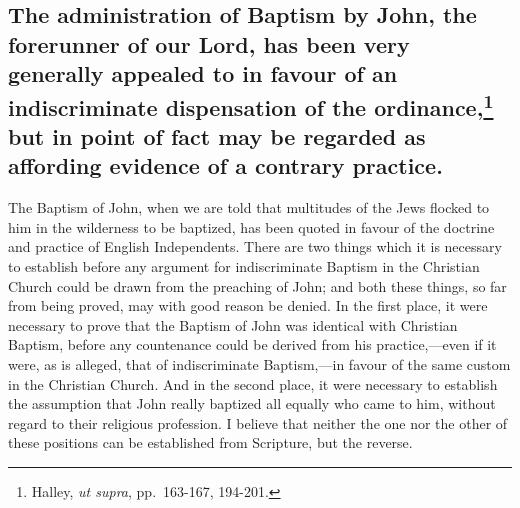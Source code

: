 \documentclass[]{book}
\begin{document}
\hypertarget{the-administration-of-baptism-by-john-the-forerunner-of-our-lord-has-been-very-generally-appealed-to-in-favour-of-an-indiscriminate-dispensation-of-the-ordinance21-but-in-point-of-fact-may-be-regarded-as-affording-evidence-of-a-contrary-practice.}{%
\subsection[The administration of Baptism by John, the forerunner of our Lord, has been very generally appealed to in favour of an indiscriminate dispensation of the ordinance, but in point of fact may be regarded as affording evidence of a contrary practice.]{\texorpdfstring{The administration of Baptism by John, the forerunner of our Lord, has been very generally appealed to in favour of an indiscriminate dispensation of the ordinance,\footnote{Halley, \emph{ut supra}, pp.~163-167, 194-201.} but in point of fact may be regarded as affording evidence of a contrary practice.}{The administration of Baptism by John, the forerunner of our Lord, has been very generally appealed to in favour of an indiscriminate dispensation of the ordinance, but in point of fact may be regarded as affording evidence of a contrary practice.}}\label{the-administration-of-baptism-by-john-the-forerunner-of-our-lord-has-been-very-generally-appealed-to-in-favour-of-an-indiscriminate-dispensation-of-the-ordinance21-but-in-point-of-fact-may-be-regarded-as-affording-evidence-of-a-contrary-practice.}}

The Baptism of John, when we are told that multitudes of the Jews flocked to him in the wilderness to be baptized, has been quoted in favour of the doctrine and practice of English Independents. There are two things which it is necessary to establish before any argument for indiscriminate Baptism in the Christian Church could be drawn from the preaching of John; and both these things, so far from being proved, may with good reason be denied. In the first place, it were necessary to prove that the Baptism of John was identical with Christian Baptism, before any countenance could be derived from his practice,---even if it were, as is alleged, that of indiscriminate Baptism,---in favour of the same custom in the Christian Church. And in the second place, it were necessary to establish the assumption that John really baptized all equally who came to him, without regard to their religious profession. I believe that neither the one nor the other of these positions can be established from Scripture, but the reverse.
\end{document}
